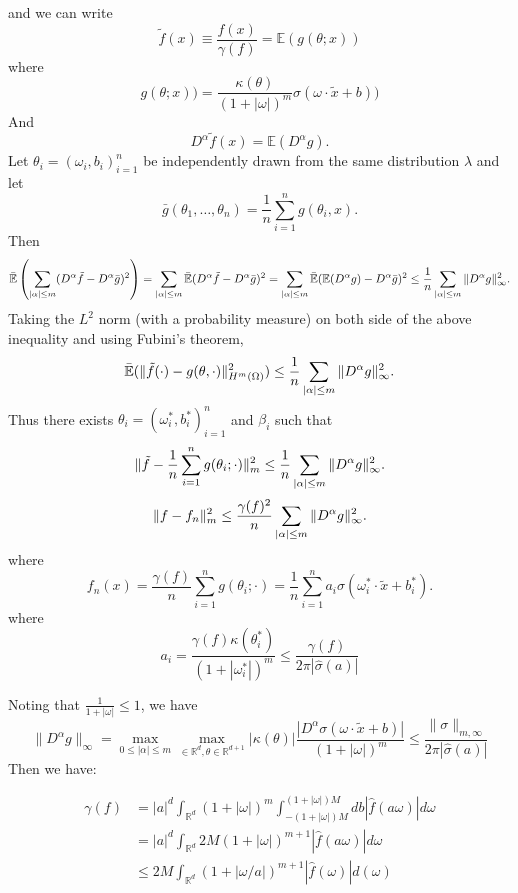 and we can write
\begin{equation}
\tilde f(x)\equiv\frac{f(x)}{\gamma(f)}
=\mathbb{E}(g(\theta; x))
\end{equation}
where
\begin{equation}
\label{gx}
g(\theta; x))
=\frac{\kappa(\theta)}{(1+|\omega|)^m}\sigma(\omega\cdot\tilde x+b)) 
\end{equation}
And 
\begin{equation}
D^\alpha \tilde f(x)=\mathbb{E}(D^\alpha g).
\end{equation}
Let $\theta_i=(\omega_i,b_i)_{i=1}^n$ be independently drawn from the same distribution $\lambda$ and let 
$$
\bar g(\theta_1,\ldots,\theta_n)
=\frac{1}{n} \sum_{i=1}^ng(\theta_i, x).
$$
Then
$$
\bar{\mathbb E} \left(\sum_{|\alpha|\le m}(D^\alpha \tilde f-D^\alpha \bar
g)^2\right) 
=\sum_{|\alpha|\le m}\bar{\mathbb E} (D^\alpha \tilde f-D^\alpha \bar g)^2
=\sum_{|\alpha|\le m}\bar{\mathbb E} (\mathbb E(D^\alpha g)-D^\alpha \bar g)^2 
\le{1\over n}\sum_{|\alpha|\le m}\|D^\alpha g\|_\infty^2.
$$
Taking the $L^2$ norm (with a probability measure) on both side of the above inequality
and using Fubini's theorem,
\begin{equation}
\mathbb{\bar{\mathbb{E}}}(\|\tilde f(\cdot)-g(\theta,\cdot)\|^2_{H^m(\Omega)})
\le{1\over n}\sum_{|\alpha|\le m}\|D^\alpha g\|_\infty^2.
\end{equation}
Thus there exists $\theta_i=(\omega_i^*,b_i^*)_{i=1}^n$ and $\beta_i$ such that 
$$
\|\tilde f-\frac{1}{n}\sum_{i=1}^{n} g(\theta_i; \cdot)\|_m^2
\le{1\over n}\sum_{|\alpha|\le m}\|D^\alpha g\|_\infty^2.
$$
$$
\|f-f_n\|_m^2
\le{\gamma(f)^2\over n}
\sum_{|\alpha|\le m}\|D^\alpha g\|_\infty^2.
$$
where
$$
f_n(x)=\frac{\gamma(f)}{n}\sum_{i=1}^{n} g(\theta_i; \cdot)=\frac{1}{n} \sum_{i=1}^n a_i\sigma(\omega_i^*\cdot\tilde{x}+b_i^*).
$$
where 
$$
a_i= \frac{\gamma(f)\kappa(\theta_i^*)}{(1+|\omega_i^*|)^m} \le \frac{\gamma(f)}{2\pi|\hat{\sigma}(a)|}
$$

Noting that $\frac{1}{1+|\omega|}\le1$, we have
$$
\|D^\alpha g\|_{\infty}=
\max_{0\le|\alpha|\le m}\max_{\in\mathbb{R}^d,\theta\in\mathbb{R}^{d+1}}|\kappa(\theta)|\frac{|D^\alpha\sigma(\omega\cdot\tilde x+b)|}{(1+|\omega|)^m}\le \frac{\|\sigma\|_{m,\infty}}{2\pi|\hat{\sigma}(a)|}
$$
Then we have:

\begin{equation}
\begin{aligned}
\gamma(f)&=|a|^d\int_{\mathbb{R}^d}(1+|\omega|)^m \int_{-(1+|\omega|)M}^{(1+|\omega|)M}db |\hat{f}(a\omega)|d\omega \\
&= |a|^d\int_{\mathbb{R}^d}2M(1+|\omega|)^{m+1} |\hat{f}(a\omega)|d\omega\\
&\le 2M \int_{\mathbb{R}^d}(1+|\omega/a|)^{m+1} |\hat{f}(\omega)|d(\omega)\\
\end{aligned}
\end{equation}

